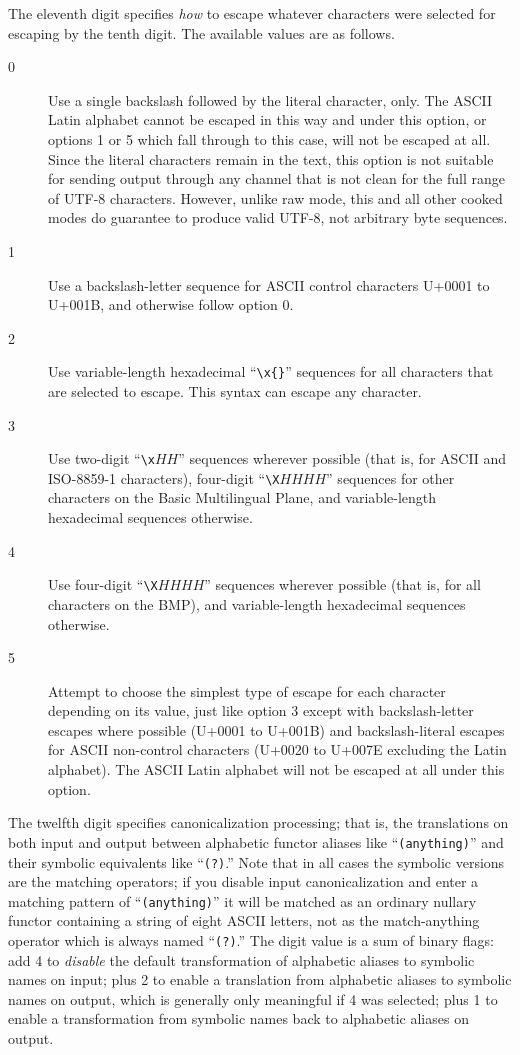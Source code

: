 \documentclass[twocolumn]{report}
\begin{document}
The eleventh digit specifies \emph{how} to escape whatever characters were
selected for escaping by the tenth digit.  The available values are as
follows.
\begin{description}
  \item[0] Use a single backslash followed by the literal character, only.
    The ASCII Latin alphabet
    cannot be escaped in this way and under this option, or options 1 or 5
    which fall through to this case, will not be escaped at all.  Since the
    literal characters remain in the text, this option is not
    suitable for sending output through any channel that is not clean
    for the full range of UTF-8 characters.  However, unlike raw mode, this
    and all other cooked modes do guarantee to produce valid UTF-8, not
    arbitrary byte sequences.
  \item[1] Use a backslash-letter sequence for ASCII control characters
    U+0001 to U+001B, and otherwise follow option 0.
  \item[2] Use variable-length hexadecimal ``\texttt{\textbackslash x\{\}}''
    sequences for all characters that are selected to escape.  This syntax
    can escape any character.
  \item[3] Use two-digit ``\texttt{\textbackslash x}$HH$'' sequences
    wherever possible (that is, for ASCII and ISO-8859-1 characters),
    four-digit ``\texttt{\textbackslash X}$HHHH$'' sequences for
    other characters on the Basic Multilingual Plane,
    and variable-length hexadecimal sequences otherwise.
  \item[4] Use four-digit ``\texttt{\textbackslash X}$HHHH$'' sequences
    wherever possible (that is, for all characters on the BMP), and
    variable-length hexadecimal sequences otherwise.
  \item[5] Attempt to choose the simplest type of escape
    for each character depending on its value, just like option 3 except
    with backslash-letter escapes where possible (U+0001 to U+001B) and
    backslash-literal escapes for ASCII non-control characters
    (U+0020 to U+007E excluding the Latin alphabet).  The ASCII Latin
    alphabet will not be escaped at all under this option.
\end{description}

The twelfth digit specifies canonicalization processing; that is, the
translations on both input and output between alphabetic functor aliases
like ``\texttt{(anything)}'' and their symbolic equivalents like
``\texttt{(?)}.'' Note that in all cases the symbolic versions are the
matching operators; if you disable input canonicalization and enter a
matching pattern of ``\texttt{(anything)}'' it will be matched as an ordinary
nullary functor containing a string of eight ASCII letters, not as the
match-anything operator which is always named ``\texttt{(?)}.'' The digit
value is a sum of binary flags: add 4 to \emph{disable} the default
transformation of alphabetic aliases to symbolic names on input; plus 2 to
enable a translation from alphabetic aliases to symbolic names on output,
which is generally only meaningful if 4 was selected; plus 1 to enable a
transformation from symbolic names back to alphabetic aliases on output.
\end{document}
